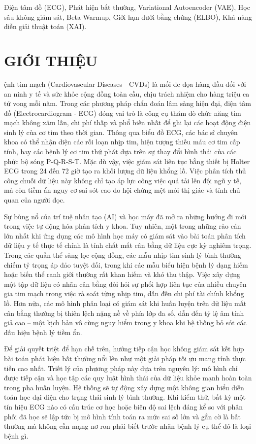 \documentclass[conference]{IEEEtran}
\begin{document}
\begin{IEEEkeywords}
Điện tâm đồ (ECG), Phát hiện bất thường, Variational Autoencoder (VAE), Học sâu không giám sát, Beta-Warmup, Giới hạn dưới bằng chứng (ELBO), Khả năng diễn giải thuật toán (XAI).
\end{IEEEkeywords}

\section{GIỚI THIỆU}
ệnh tim mạch (Cardiovascular Diseases - CVDs) là mối đe dọa hàng đầu đối với an ninh y tế và sức khỏe cộng đồng toàn cầu, chịu trách nhiệm cho hàng triệu ca tử vong mỗi năm. Trong các phương pháp chẩn đoán lâm sàng hiện đại, điện tâm đồ (Electrocardiogram - ECG) đóng vai trò là công cụ thăm dò chức năng tim mạch không xâm lấn, chi phí thấp và phổ biến nhất để ghi lại các hoạt động điện sinh lý của cơ tim theo thời gian. Thông qua biểu đồ ECG, các bác sĩ chuyên khoa có thể nhận diện các rối loạn nhịp tim, hiện tượng thiếu máu cơ tim cấp tính, hay các bệnh lý cơ tim thứ phát dựa trên sự thay đổi hình thái của các phức bộ sóng P-Q-R-S-T. Mặc dù vậy, việc giám sát liên tục bằng thiết bị Holter ECG trong 24 đến 72 giờ tạo ra khối lượng dữ liệu khổng lồ. Việc phân tích thủ công chuỗi dữ liệu này không chỉ tạo áp lực công việc quá tải lên đội ngũ y tế, mà còn tiềm ẩn nguy cơ sai sót cao do hội chứng mệt mỏi thị giác và tính chủ quan của người đọc.

Sự bùng nổ của trí tuệ nhân tạo (AI) và học máy đã mở ra những hướng đi mới trong việc tự động hóa phân tích y khoa. Tuy nhiên, một trong những rào cản lớn nhất khi ứng dụng các mô hình học máy có giám sát vào bài toán phân tích dữ liệu y tế thực tế chính là tính chất mất cân bằng dữ liệu cực kỳ nghiêm trọng. Trong các quần thể sàng lọc cộng đồng, các mẫu nhịp tim sinh lý bình thường chiếm tỷ trọng áp đảo tuyệt đối, trong khi các mẫu biểu hiện bệnh lý dạng hiếm hoặc biến thể ranh giới thường rất khan hiếm và khó thu thập. Việc xây dựng một tập dữ liệu có nhãn cân bằng đòi hỏi sự phối hợp liên tục của nhiều chuyên gia tim mạch trong việc rà soát từng nhịp tim, dẫn đến chi phí tài chính khổng lồ. Hơn nữa, các mô hình phân loại có giám sát khi huấn luyện trên dữ liệu mất cân bằng thường bị thiên lệch nặng nề về phía lớp đa số, dẫn đến tỷ lệ âm tính giả cao -- một kịch bản vô cùng nguy hiểm trong y khoa khi hệ thống bỏ sót các dấu hiệu bệnh lý tiềm ẩn.

Để giải quyết triệt để hạn chế trên, hướng tiếp cận học không giám sát kết hợp bài toán phát hiện bất thường nổi lên như một giải pháp tối ưu mang tính thực tiễn cao nhất. Triết lý của phương pháp này dựa trên nguyên lý: mô hình chỉ được tiếp cận và học tập các quy luật hình thái của dữ liệu khỏe mạnh hoàn toàn trong pha huấn luyện. Hệ thống sẽ tự động xây dựng một không gian biểu diễn toán học đại diện cho trạng thái sinh lý bình thường. Khi kiểm thử, bất kỳ một tín hiệu ECG nào có cấu trúc cơ học hoặc biên độ sai lệch đáng kể so với phân phối đã học sẽ lập tức bị mô hình tính toán ra mức sai số lớn và gắn cờ là bất thường mà không cần mạng nơ-ron phải biết trước nhãn bệnh lý cụ thể đó là loại bệnh gì.
\end{document}
